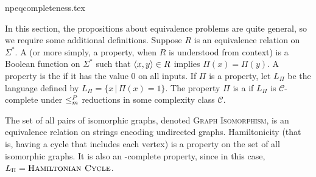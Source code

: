 \begin{filecontents}{npeqcompleteness.tex}

In this section, the propositions about equivalence problems are quite general, so we require some additional definitions.
Suppose $R$ is an equivalence relation on $\Sigma^*$.
A  (or more simply, a property, when $R$ is understood from context) is a Boolean function on $\Sigma^*$ such that $\pair{x}{y} \in R$ implies $\Pi(x) = \Pi(y)$.
A property is the  if it has the value $0$ on all inputs.
If $\Pi$ is a property, let $L_\Pi$ be the language defined by $L_\Pi = \{ x \, | \, \Pi(x) = 1 \}$.
The property $\Pi$ is a  if $L_\Pi$ is $\mathcal{C}$-complete under $\mor$ reductions in some complexity class $\mathcal{C}$.
\begin{example}
  The set of all pairs of isomorphic graphs, denoted \textsc{Graph Isomorphism}, is an equivalence relation on strings encoding undirected graphs.
  Hamiltonicity (that is, having a cycle that includes each vertex) is a property on the set of all isomorphic graphs. %
  It is also an \NP-complete property, since in this case, $L_\Pi = \textsc{Hamiltonian Cycle}$.
\end{example}


\end{filecontents}

